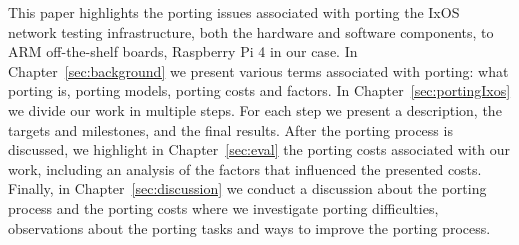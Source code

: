 This paper highlights the porting issues associated with porting the IxOS
network testing infrastructure, both the hardware and software components, to
ARM off-the-shelf boards, Raspberry Pi 4 in our case. In
Chapter~\ref{sec:background} we present various terms associated with porting:
what porting is, porting models, porting costs and factors. In
Chapter~\ref{sec:portingIxos} we divide our work in multiple steps. For each
step we present a description, the targets and milestones, and the final
results. After the porting process is discussed, we highlight in
Chapter~\ref{sec:eval} the porting costs associated with our work, including an
analysis of the factors that influenced the presented costs. Finally, in
Chapter~\ref{sec:discussion} we conduct a discussion about the porting process
and the porting costs where we investigate porting difficulties, observations
about the porting tasks and ways to improve the porting process. 

